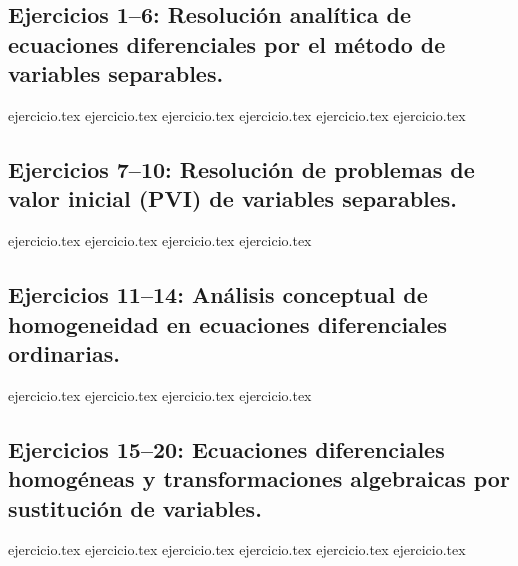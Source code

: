 
\subsection*{Ejercicios 1--6: Resolución analítica de ecuaciones diferenciales por el método de variables separables.}
\begin{enumerate}
    {ejercicio.tex}
    {ejercicio.tex}
    {ejercicio.tex}
    {ejercicio.tex}
    {ejercicio.tex}
    {ejercicio.tex}
\end{enumerate}

\subsection*{Ejercicios 7--10: Resolución de problemas de valor inicial (PVI) de variables separables.}
\begin{enumerate}
    \setcounter{enumi}{6}
    {ejercicio.tex}
    {ejercicio.tex}
    {ejercicio.tex}
    {ejercicio.tex}
\end{enumerate}

\subsection*{Ejercicios 11--14: Análisis conceptual de homogeneidad en ecuaciones diferenciales ordinarias.}
\begin{enumerate}
    \setcounter{enumi}{10}
    {ejercicio.tex}
    {ejercicio.tex}
    {ejercicio.tex}
    {ejercicio.tex}
\end{enumerate}

\subsection*{Ejercicios 15--20: Ecuaciones diferenciales homogéneas y transformaciones algebraicas por sustitución de variables.}
\begin{enumerate}
    \setcounter{enumi}{14}
    {ejercicio.tex}
    {ejercicio.tex}
    {ejercicio.tex}
    {ejercicio.tex}
    {ejercicio.tex}
    {ejercicio.tex}
\end{enumerate}


